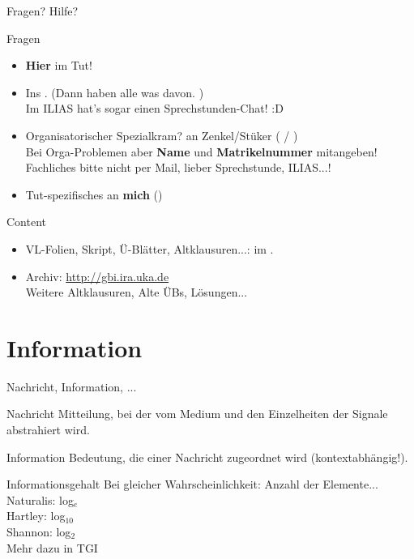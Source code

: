 \begin{frame}{Fragen? Hilfe?}	
	\begin{block}{Fragen}
		\begin{itemize}
			\item \textbf{Hier} im Tut!
			\item Ins \ILIAS. (Dann haben alle was davon. \smiley) \\
				  Im ILIAS hat's sogar einen Sprechstunden-Chat! :D
			\pause
			\item Organisatorischer Spezialkram? \impl an Zenkel/Stüker ( / ) \\
			Bei Orga-Problemen aber \textbf{Name} und \textbf{Matrikelnummer}  mitangeben! \\
			Fachliches bitte nicht per Mail, lieber \impl Sprechstunde, ILIAS...!
			\item Tut-spezifisches an \textbf{mich} (\mailto{\mymail})
		\end{itemize}
	\end{block}
	\pause
	\begin{block}{Content}
		\begin{itemize}
			\item VL-Folien, Skript, Ü-Blätter, Altklausuren...: im \ILIAS.
			\item Archiv: \url{http://gbi.ira.uka.de} \\
			Weitere Altklausuren, Alte ÜBs, Lösungen...
		\end{itemize}
	\end{block}
\end{frame}


\section{Information}

\begin{frame}{Nachricht, Information, ...}
	
	\begin{block}{Nachricht}
		      Mitteilung, bei der vom Medium und den Einzelheiten der Signale abstrahiert wird.
	\end{block}
	
	\pause
	\begin{block}{Information}
		      Bedeutung, die einer Nachricht zugeordnet wird (kontextabhängig!).
	\end{block}
	
	\pause
	\begin{block}{Informationsgehalt}
		Bei gleicher Wahrscheinlichkeit: Anzahl der Elemente... \\
		      Naturalis: log$_{e}$ \\
		      Hartley: log$_{10}$ \\
		      Shannon: log$_{2}$ \\[1em]
		\impl Mehr dazu in TGI
	\end{block}

\end{frame}

